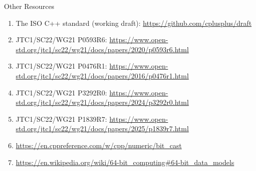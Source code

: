 
\begin{frame}{Other Resources}
  \begin{enumerate}
  \item The ISO C++ standard (working draft): \url{https://github.com/cplusplus/draft}

  \item JTC1/SC22/WG21 P0593R6: \url{https://www.open-std.org/jtc1/sc22/wg21/docs/papers/2020/p0593r6.html}
  \item JTC1/SC22/WG21 P0476R1: \url{https://www.open-std.org/jtc1/sc22/wg21/docs/papers/2016/p0476r1.html}
  \item JTC1/SC22/WG21 P3292R0: \url{https://www.open-std.org/jtc1/sc22/wg21/docs/papers/2024/p3292r0.html}
  \item JTC1/SC22/WG21 P1839R7: \url{https://www.open-std.org/jtc1/sc22/wg21/docs/papers/2025/p1839r7.html}

  \item \url{https://en.cppreference.com/w/cpp/numeric/bit_cast}

  \item \url{https://en.wikipedia.org/wiki/64-bit_computing\#64-bit_data_models}

  \end{enumerate}
\end{frame}
